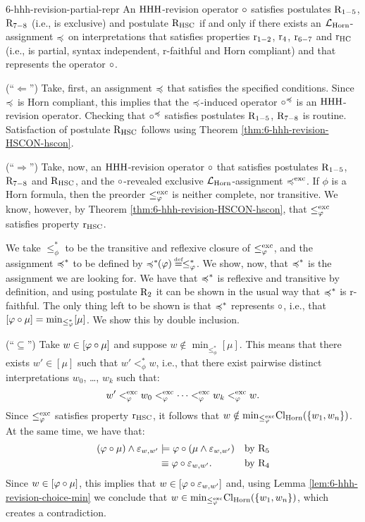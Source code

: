 \begin{thm}{}{6-hhh-revision-partial-repr}
	An ${\mathrm{HHH}}$-revision operator $\circ$ 
	satisfies postulates $\mathrm{R}_{1-5}$, $\mathrm{R}_{7-8}$ (i.e., is exclusive)
	and postulate $\mathrm{R}_{{\mathrm{HSC}}}$
	if and only if there exists
	an $\mathcal{L}_{\mathrm{Horn}}$-assignment $\preccurlyeq$ on interpretations
	that 
	satisfies properties $\mathrm{r}_{1-2}$, $\mathrm{r}_{4}$, $\mathrm{r}_{6-7}$ and $\mathrm{r}_{\mathrm{HC}}$
	(i.e., is partial, syntax independent, r-faithful and 
	Horn compliant) 
	and that represents the operator $\circ$.
\end{thm}
\begin{prf*}{}{}%
	(``$\Leftarrow$'')
	Take, first, an assignment $\preccurlyeq$ that satisfies the 
	specified conditions.
	Since $\preccurlyeq$ is Horn compliant, this
	implies that the $\preccurlyeq$-induced operator $\circ^{\preccurlyeq}$ is an ${\mathrm{HHH}}$-revision operator.
	Checking that $\circ^{\preccurlyeq}$ satisfies postulates $\mathrm{R}_{1-5}$, $\mathrm{R}_{7-8}$ is routine.
	Satisfaction of postulate $\mathrm{R}_{{\mathrm{HSC}}}$ 
	follows using Theorem \ref{thm:6-hhh-revision-HSCON-hscon}.

	(``$\Rightarrow$'')
	Take, now, an ${\mathrm{HHH}}$-revision operator $\circ$ that satisfies 
	postulates $\mathrm{R}_{1-5}$, $\mathrm{R}_{7-8}$ and $\mathrm{R}_{{\mathrm{HSC}}}$,
	and the $\circ$-revealed exclusive $\mathcal{L}_{\mathrm{Horn}}$-assignment $\preccurlyeq^{{\operatorname{exc}}}$.
	If $\phi$ is a Horn formula,
	then the preorder $\le^{{\operatorname{exc}}}_{\varphi}$ is neither complete, nor transitive.
	We know, however, by Theorem \ref{thm:6-hhh-revision-HSCON-hscon},
	that $\le^{{\operatorname{exc}}}_{\varphi}$ satisfies property $\mathrm{r}_{{\mathrm{HSC}}}$.

	We take $\le^{\ast}_{\phi}$ to be the transitive 
	and reflexive closure of $\le^{{\operatorname{exc}}}_{\varphi}$,
	and the assignment $\preccurlyeq^{\ast}$ to be defined by $\as^{\ast}\!\!(\phi) \defeq \le^{\ast}_{\phi}$.
	We show, now, that $\preccurlyeq^{\ast}$ is the assignment we are looking for.
	We have that $\preccurlyeq^{\ast}$ is reflexive and transitive by definition,
	and using postulate $\mathrm{R}_{2}$ it can be shown in the usual way that $\preccurlyeq^{\ast}$ is r-faithful.
	The only thing left to be shown is that $\preccurlyeq^{\ast}$ represents $\circ$,
	i.e., that $[\varphi\circ\mu]={\operatorname{min}}_{\le^{\ast}_{\varphi}}[\mu]$.
	We show this by double inclusion.

	(``$\subseteq$'')
	Take $w\in[\varphi\circ\mu]$ and suppose $w\notin\min_{\le^{\ast}_{\phi}}[\mu]$.
	This means that there exists $w'\in[\mu]$ such that $w'<^{\ast}_{\phi}w$,
	i.e., that there exist pairwise distinct interpretations 
	$w_0$, \dots, $w_k$ such that:
	$$
		w'<^{{\operatorname{exc}}}_{\varphi} w_0<^{{\operatorname{exc}}}_{\varphi}\dots <^{{\operatorname{exc}}}_{\varphi}w_k <^{{\operatorname{exc}}}_{\varphi} w.
	$$
	Since $\le^{{\operatorname{exc}}}_{\varphi}$ satisfies property $\mathrm{r}_{{\mathrm{HSC}}}$,
	it follows that $w\notin{\operatorname{min}}_{\le^{{\operatorname{exc}}}_{\varphi}}{\operatorname{Cl}}_{\mathrm{Horn}}(\{w_1,w_n\})$.
	At the same time, we have that:
	\begin{align*}
		(\varphi\circ\mu)\land\varepsilon_{w,w'}&\models \varphi\circ(\mu\land\varepsilon_{w,w'}) &\text{by}~\mathrm{R}_{5}\\
										&\equiv \varphi\circ\varepsilon_{w,w'}. &\text{by}~\mathrm{R}_{4}
	\end{align*}
	Since $w\in[\varphi\circ\mu]$, this implies that $w\in[\varphi\circ\varepsilon_{w,w'}]$
	and,
	using Lemma \ref{lem:6-hhh-revision-choice-min}
	we conclude that $w \in{\operatorname{min}}_{\le^{{\operatorname{exc}}}_{\varphi}}{\operatorname{Cl}}_{\mathrm{Horn}}(\{w_1,w_n\})$,
	which creates a contradiction.


\end{prf*}
